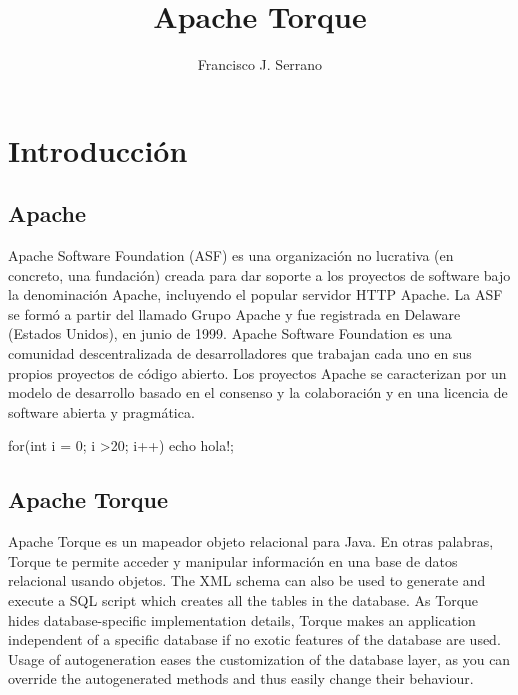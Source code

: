\documentclass[12pt, oneside]{article}
\title{Apache Torque}
\author{Francisco J. Serrano}
\begin{document}
\maketitle
\tableofcontents

\section{Introducción}

\subsection{Apache}
Apache Software Foundation (ASF) es una organización no lucrativa (en concreto, una fundación) creada para dar soporte a los proyectos de software bajo la denominación Apache, incluyendo el popular servidor HTTP Apache. La ASF se formó a partir del llamado Grupo Apache y fue registrada en Delaware (Estados Unidos), en junio de 1999.
Apache Software Foundation es una comunidad descentralizada de desarrolladores que trabajan cada uno en sus propios proyectos de código abierto. Los proyectos Apache se caracterizan por un modelo de desarrollo basado en el consenso y la colaboración y en una licencia de software abierta y pragmática.

\begin{listings}
	for(int i = 0; i >20; i++) {
		echo hola!;
	}
\end{listings}

\subsection{Apache Torque}
Apache Torque es un mapeador objeto relacional para Java. En otras palabras, Torque te permite acceder y manipular información en una base de datos relacional usando objetos. 
The XML schema can also be used to generate and execute a SQL script which creates all the tables in the database.
As Torque hides database-specific implementation details, Torque makes an application independent of a specific database if no exotic features of the database are used.
Usage of autogeneration eases the customization of the database layer, as you can override the autogenerated methods and thus easily change their behaviour.
\end{document}
